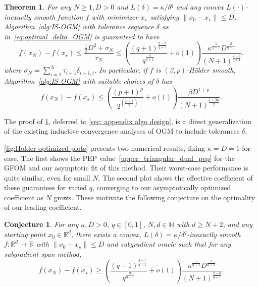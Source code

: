 \documentclass[11pt, hidelinks]{article}
\numberwithin{equation}{section}
\theoremstyle{thmstyletwo}%
\newtheorem{theorem}[thm]{Theorem}
\newtheorem{conjecture}[thm]{Conjecture}
\numberwithin{equation}{section}
\newcommand{\R}{\mathbb{R}}
\newcommand{\N}{\mathbb{N}}
\newcommand{\Holder}{H\"older }
\begin{document}
\begin{theorem}\label{thm:UOGM-k/delta-q}
    For any $N\geq 1, D>0$ and $L(\delta)=\kappa/\delta^q$ and any convex $L(\cdot)$-inexactly smooth function $f$ with minimizer $x_\star$ satisfying $\|x_0-x_\star\|\leq D$, Algorithm~\ref{alg:IS-OGM} with tolerance sequence $\delta$ as in~\eqref{eq:optimal_delta_OGM} is guaranteed to have 
    $$f(x_N)-f(x_\star) \leq \frac{\frac{1}{2}D^2+\sigma_N}{\tau_N} \leq \left(\frac{(q+1)^\frac{q-1}{q+1}}{q^\frac{q}{q+1}}+o(1)\right)\frac{\kappa^\frac{1}{q+1}D^\frac{2}{q+1}}{(N+1)^\frac{2-q}{q+1}}.$$
    where $\sigma_N = \sum_{i=1}^N \tau_{i-1}\delta_{i-1,i}$.
    In particular, if $f$ is $(\beta, p)$-\Holder smooth, Algorithm~\ref{alg:IS-OGM} with suitable choices of $\delta$ has
    $$f(x_N)-f(x_\star) \leq \left(\frac{\left(p+1\right)^{p}}{2^{\left(\frac{p+1}{2}\right)}}+o(1)\right)\frac{\beta D^{1+p}}{(N+1)^{\frac{1+3p}{2}}}.$$ 
\end{theorem}
The proof of \cref{thm:UOGM-k/delta-q}, deferred to \cref{sec: appendix algo design}, is a direct generalization of the existing inductive convergence analyses of OGM to include tolerances $\delta$.



\cref{fig:Holder-optimized-plots} presents two numerical results, fixing $\kappa = D = 1$ for ease. The first shows the PEP value~\eqref{upper_triangular_dual_pep} for the GFOM and our asymptotic fit of this method. Their worst-case performance is quite similar, even for small $N$. The second plot shows the effective coefficient of these guarantees for varied $q$, converging to our asymptotically optimized coefficient as $N$ grows. These motivate the following conjecture on the optimality of our leading coefficient.

\begin{conjecture}
     For any $\kappa, D > 0$, $q \in [0,1]$, $N, d \in \N$ with $d \geq N+2$, and any starting point $x_0 \in \R^d$, there exists a convex, $L(\delta) = \kappa/\delta^q$-inexactly smooth $f : \R^d \to \R$ with $\|x_0 -x_\star\| \leq D$ and subgradient oracle such that for any subgradient span method, $$f(x_N)-f(x_\star) \geq \left(\frac{(q+1)^\frac{q-1}{q+1}}{q^\frac{q}{q+1}}+o(1)\right)\frac{\kappa^\frac{1}{q+1}D^\frac{2}{q+1}}{(N+1)^\frac{2-q}{q+1}}.$$
\end{conjecture}

 
\end{document}
